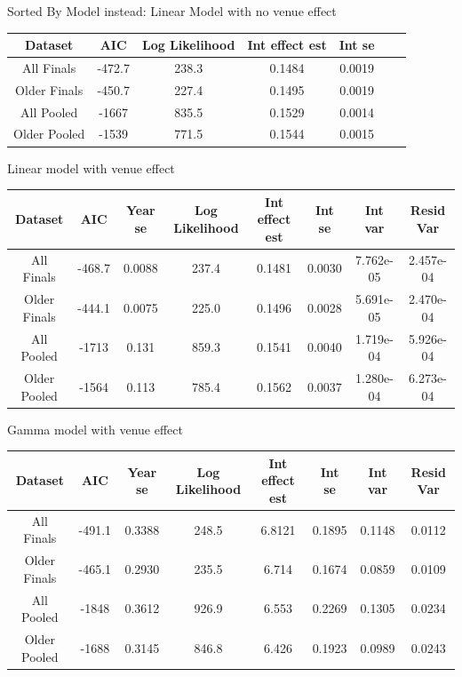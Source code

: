 \documentclass[12pt, letterpaper, titlepage]{article}
\begin{document}
Sorted By Model instead:
Linear Model with no venue effect
\begin{center}
  \begin{tabular}{|c | c | c | c | c | c | c |} 
   \hline
   Dataset & AIC & Log Likelihood & Int effect est & Int se \\ [0.5ex] 
   \hline\hline
   All Finals & -472.7 & 238.3 & 0.1484 & 0.0019 \\
   \hline
   Older Finals & -450.7 & 227.4 & 0.1495 & 0.0019 \\ 
   \hline
   All Pooled & -1667 & 835.5 & 0.1529 & 0.0014 \\
   \hline
   Older Pooled & -1539 & 771.5 & 0.1544 & 0.0015 \\
   \hline
  \end{tabular}
  \end{center}

Linear model with venue effect
\begin{center}
  \begin{tabular}{|c | c | c | c | c | c | c | c |} 
   \hline
   Dataset & AIC & Year se & Log Likelihood & Int effect est & Int se & Int var & Resid Var \\ [0.5ex] 
   \hline\hline
   All Finals & -468.7 & 0.0088 & 237.4 & 0.1481 & 0.0030 & 7.762e-05 & 2.457e-04 \\
   \hline
   Older Finals & -444.1 & 0.0075 & 225.0 & 0.1496 & 0.0028 & 5.691e-05 & 2.470e-04 \\ 
   \hline
   All Pooled & -1713 & 0.131 & 859.3 & 0.1541 & 0.0040 & 1.719e-04 & 5.926e-04 \\
   \hline
   Older Pooled & -1564 & 0.113 & 785.4 & 0.1562 & 0.0037 & 1.280e-04 & 6.273e-04 \\
   \hline
  \end{tabular}
  \end{center}

Gamma model with venue effect
\begin{center}
  \begin{tabular}{|c | c | c | c | c | c | c | c |} 
   \hline
   Dataset & AIC & Year se & Log Likelihood & Int effect est & Int se & Int var & Resid Var \\ [0.5ex] 
   \hline\hline
   All Finals & -491.1 & 0.3388 & 248.5 & 6.8121 & 0.1895 & 0.1148 & 0.0112 \\
   \hline
   Older Finals & -465.1 & 0.2930 & 235.5 & 6.714 & 0.1674 & 0.0859 & 0.0109 \\ 
   \hline
   All Pooled & -1848 & 0.3612 & 926.9 & 6.553 & 0.2269 & 0.1305 & 0.0234 \\
   \hline
   Older Pooled & -1688 & 0.3145 & 846.8 & 6.426 & 0.1923 & 0.0989 & 0.0243 \\
   \hline
  \end{tabular}
  \end{center}
\end{document}
